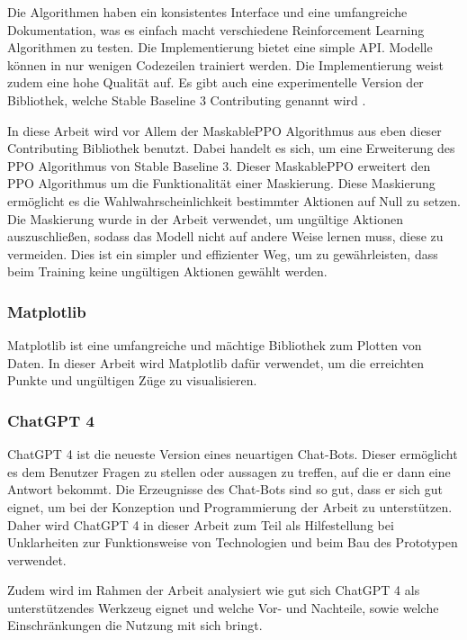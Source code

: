 Die Algorithmen haben ein konsistentes Interface und eine umfangreiche Dokumentation, was es einfach macht verschiedene Reinforcement Learning Algorithmen zu testen. Die Implementierung bietet eine simple API. Modelle können in nur wenigen Codezeilen trainiert werden. Die Implementierung weist zudem eine hohe Qualität auf. Es gibt auch eine experimentelle Version der Bibliothek, welche Stable Baseline 3 Contributing genannt wird \cite[Seite 1-3]{noauthor_stable-baselines3_nodate}.

In diese Arbeit wird vor Allem der MaskablePPO Algorithmus aus eben dieser Contributing Bibliothek benutzt. Dabei handelt es sich, um eine Erweiterung des PPO Algorithmus von Stable Baseline 3. Dieser MaskablePPO erweitert den PPO Algorithmus um die Funktionalität einer Maskierung. Diese Maskierung ermöglicht es die Wahlwahrscheinlichkeit bestimmter Aktionen auf Null zu setzen. Die Maskierung wurde in der Arbeit verwendet, um ungültige Aktionen auszuschließen, sodass das Modell nicht auf andere Weise lernen muss, diese zu vermeiden. Dies ist ein simpler und effizienter Weg, um zu gewährleisten, dass beim Training keine ungültigen Aktionen gewählt werden.
\subsubsection{Matplotlib}
Matplotlib ist eine umfangreiche und mächtige Bibliothek zum Plotten von Daten. In dieser Arbeit wird Matplotlib dafür verwendet, um die erreichten Punkte und ungültigen Züge zu visualisieren.
\subsubsection{ChatGPT 4}
ChatGPT 4 ist die neueste Version eines neuartigen Chat-Bots. Dieser ermöglicht es dem Benutzer Fragen zu stellen oder aussagen zu treffen, auf die er dann eine Antwort bekommt. Die Erzeugnisse des Chat-Bots sind so gut, dass er sich gut eignet, um bei der Konzeption und Programmierung der Arbeit zu unterstützen. Daher wird ChatGPT 4 in dieser Arbeit zum Teil als Hilfestellung bei Unklarheiten zur Funktionsweise von Technologien und beim Bau des Prototypen verwendet. 

Zudem wird im Rahmen der Arbeit analysiert wie gut sich ChatGPT 4 als unterstützendes Werkzeug eignet und welche Vor- und Nachteile, sowie welche Einschränkungen die Nutzung mit sich bringt.